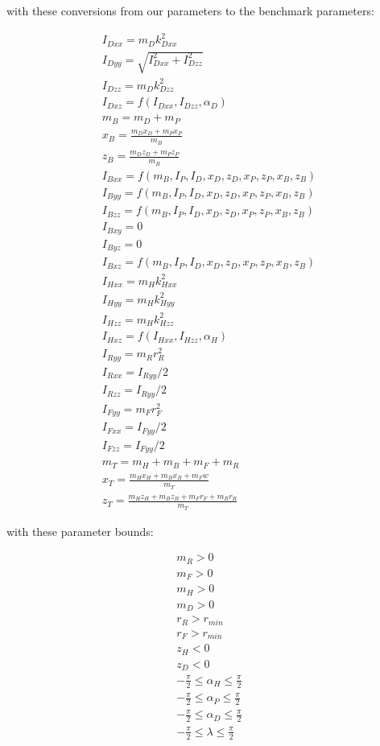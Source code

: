 \documentclass{bmd2019a}
\begin{document}
with these conversions from our parameters to the benchmark parameters:

\begin{align}
  I_{Dxx} = m_D k_{Dxx}^2 \\
  I_{Dyy} = \sqrt{I_{Dxx}^2 + I_{Dzz}^2} \\
  I_{Dzz} = m_D k_{Dzz}^2 \\
  I_{Dxz} = f(I_{Dxx}, I_{Dzz}, \alpha_D)  \\
  m_B = m_D + m_P \\
  x_B = \frac{m_D x_D + m_P x_P}{m_B} \\
  z_B = \frac{m_D z_D + m_P z_P}{m_B} \\
  I_{Bxx} = f(m_B, I_P, I_D, x_D, z_D, x_P, z_P, x_B, z_B) \\
  I_{Byy} = f(m_B, I_P, I_D, x_D, z_D, x_P, z_P, x_B, z_B) \\
  I_{Bzz} = f(m_B, I_P, I_D, x_D, z_D, x_P, z_P, x_B, z_B) \\
  I_{Bxy} = 0 \\
  I_{Byz} = 0 \\
  I_{Bxz} = f(m_B, I_P, I_D, x_D, z_D, x_P, z_P, x_B, z_B) \\
  I_{Hxx} = m_H k_{Hxx}^2 \\
  I_{Hyy} = m_H k_{Hyy}^2\\
  I_{Hzz} = m_H k_{Hzz}^2 \\
  I_{Hxz} = f(I_{Hxx}, I_{Hzz}, \alpha_H)  \\
  I_{Ryy} = m_R r_R^2 \\
  I_{Rxx} = I_{Ryy} / 2 \\
  I_{Rzz} = I_{Ryy} / 2 \\
  I_{Fyy} = m_F r_F^2 \\
  I_{Fxx} = I_{Fyy} / 2 \\
  I_{Fzz} = I_{Fyy} / 2 \\
  m_T = m_H + m_B + m_F + m_R \\
  x_T = \frac{m_H x_H + m_B x_B + m_F w}{m_T} \\
  z_T = \frac{m_H z_H + m_B z_B + m_F r_F + m_R r_R}{m_T} 
\end{align}

with these parameter bounds:

\begin{align}
  m_R > 0 \\
  m_F > 0 \\
  m_H > 0 \\
  m_D > 0 \\
  r_R > r_{min} \\
  r_F > r_{min} \\
  z_H < 0 \\
  z_D < 0 \\
  -\frac{\pi}{2} \leq \alpha_H \leq \frac{\pi}{2} \\
  -\frac{\pi}{2} \leq \alpha_P \leq \frac{\pi}{2} \\
  -\frac{\pi}{2} \leq \alpha_D \leq \frac{\pi}{2} \\
  -\frac{\pi}{2} \leq \lambda \leq \frac{\pi}{2}
\end{align}
\end{document}
